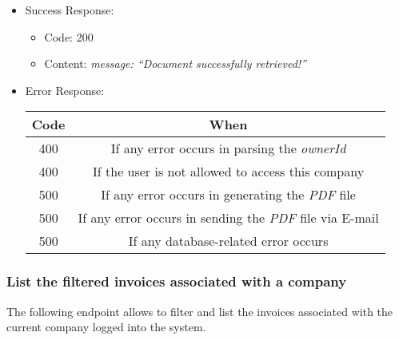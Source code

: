 \begin{itemize}
    \item Success Response: 
    \begin{itemize}
        \item Code: 200
        \item Content:
        \textit{            
{
    message: “Document successfully retrieved!”
}
        }
    \end{itemize}
    
    \item Error Response:
    \begin{table}[!h]
    \centering 
    \begin{tabular}{|c|c|}
    \hline
    \multicolumn{1}{|c|}{\textbf{Code}} & \multicolumn{1}{c|}{\textbf{When}} \\ \hline
    400 & If any error occurs in parsing the \textit{ownerId}  \\\hline
    400 & If the user is not allowed to access this company \\\hline
    500 & If any error occurs in generating the \textit{PDF} file \\\hline
    500 & If any error occurs in sending the \textit{PDF} file via E-mail\\\hline
    500 & If any database-related error occurs \\\hline
    \end{tabular} 
    \end{table} 
    
\end{itemize}



\newpage
\subsubsection*{List the filtered invoices associated with a company}

The following endpoint allows to filter and list the invoices associated with the current company logged into the system.

